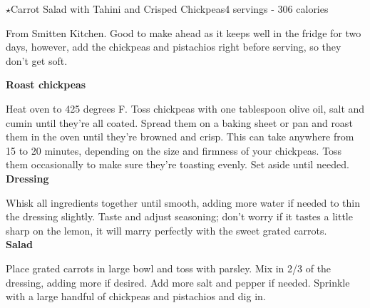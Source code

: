 \begin{recipe}{\texorpdfstring{$\star$}{str}Carrot Salad with Tahini and Crisped Chickpeas}{4 servings - 306 calories}{}

\freeform From Smitten Kitchen. Good to make ahead as it keeps well in the fridge for two days, however, add the chickpeas and pistachios right before serving, so they don’t get soft.


\textbf{Roast chickpeas}

Heat oven to 425 degrees F. Toss chickpeas with one tablespoon olive oil, salt and cumin until they’re all coated. Spread them on a baking sheet or pan and roast them in the oven until they’re browned and crisp. This can take anywhere from 15 to 20 minutes, depending on the size and firmness of your chickpeas. Toss them occasionally to make sure they’re toasting evenly. Set aside until needed.\\

\textbf{Dressing}

Whisk all ingredients together until smooth, adding more water if needed to thin the dressing slightly. Taste and adjust seasoning; don’t worry if it tastes a little sharp on the lemon, it will marry perfectly with the sweet grated carrots.\\

\textbf{Salad}

Place grated carrots in large bowl and toss with parsley. Mix in 2/3 of the dressing, adding more if desired. Add more salt and pepper if needed. Sprinkle with a large handful of chickpeas and pistachios and dig in.

\end{recipe}